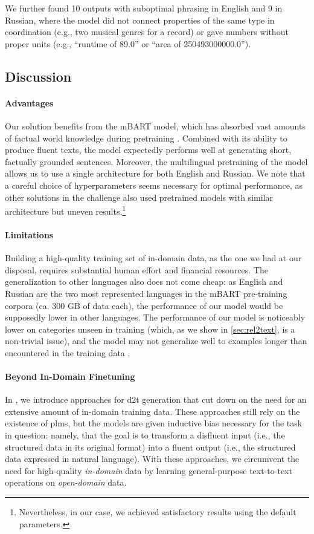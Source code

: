 We further found 10 outputs with suboptimal phrasing in English and 9 in Russian, where the model did not connect properties of the same type in coordination (e.g., two musical genres for a record) or gave numbers without proper units (e.g., ``runtime of 89.0'' or ``area of 250493000000.0'').

\subsection{Discussion}
\paragraph{Advantages} Our solution benefits from the mBART model, which has absorbed vast amounts of factual world knowledge during pretraining \cite{petroni2019language}. Combined with its ability to produce fluent texts, the model expectedly performs well at generating short, factually grounded sentences. Moreover, the multilingual pretraining of the model allows us to use a single architecture for both English and Russian. We note that a careful choice of hyperparameters seems necessary for optimal performance, as other solutions in the challenge also used pretrained models with similar architecture but uneven results.\footnote{Nevertheless, in our case, we achieved satisfactory results using the default parameters.}

\paragraph{Limitations} Building a high-quality training set of in-domain data, as the one we had at our disposal, requires substantial human effort and financial resources. The generalization to other languages also does not come cheap: as English and Russian are the two most represented languages in the mBART pre-training corpora (ca. 300 GB of data each), the performance of our model would be supposedly lower in other languages. The performance of our model is noticeably lower on categories unseen in training (which, as we show in \autoref{sec:rel2text}, is a non-trivial issue), and the model may not generalize well to examples longer than encountered in the training data \cite{zhouWhatAlgorithmsCan2023,xuCompositionalGeneralizationDatatoText2023}.


\paragraph{Beyond In-Domain Finetuning} In , we introduce approaches for \ac{d2t} generation that cut down on the need for an extensive amount of in-domain training data. These approaches still rely on the existence of \acp{plm}, but the models are given inductive bias necessary for the task in question: namely, that the goal is to transform a disfluent input (i.e., the structured data in its original format) into a fluent output (i.e., the structured data expressed in natural language). With these approaches, we circumvent the need for high-quality \emph{in-domain} data by learning general-purpose text-to-text operations on \emph{open-domain} data.


